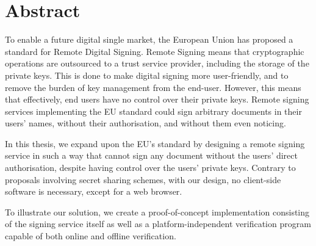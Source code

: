 \chapter{Abstract}\label{ch:abstract}
To enable a future digital single market,
the European Union has proposed a standard for Remote Digital Signing.
Remote Signing means that cryptographic operations are outsourced to a trust service provider,
including the storage of the private keys.
This is done to make digital signing more user-friendly,
and to remove the burden of key management from the end-user.
However, this means that effectively, end users have no control over their private keys.
Remote signing services implementing the EU standard could sign arbitrary documents in their users' names,
without their authorisation, and without them even noticing.

In this thesis,
we expand upon the EU's standard by designing a remote signing service in such a way that cannot sign any document without the users' direct authorisation,
despite having control over the users' private keys.
Contrary to proposals involving secret sharing schemes,
with our design, no client-side software is necessary, except for a web browser.

To illustrate our solution,
we create a proof-of-concept implementation consisting of the signing service itself as well as a
 platform-independent verification program capable of both online and offline verification.




